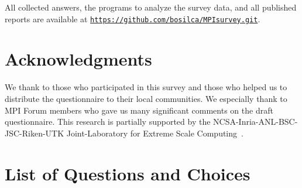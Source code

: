 \documentclass[conference,10pt,letterpaper]{IEEEtran}
\begin{document}
All collected answers, the programs to analyze the survey data,
and all published reports are available at
{\tt \url{https://github.com/bosilca/MPIsurvey.git}}. 

\section*{Acknowledgments}

We thank to those who participated in this survey and those who
helped us to distribute the questionnaire to their local
communities. We especially thank to MPI Forum members who gave us many
significant comments on the draft questionnaire.
This research is partially supported by the
NCSA-Inria-ANL-BSC-JSC-Riken-UTK Joint-Laboratory for Extreme Scale
Computing~\cite{JLESC}.




\appendix
\section{List of Questions and Choices}
\label{app:questions}
\end{document}

